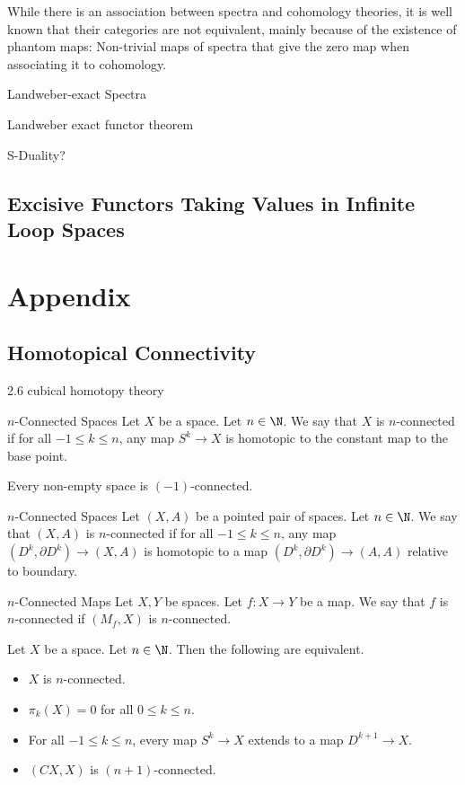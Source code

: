 \documentclass[a4paper]{article}
\begin{document}
While there is an association between spectra and cohomology theories, it is well known that their categories are not equivalent, mainly because of the existence of phantom maps: Non-trivial maps of spectra that give the zero map when associating it to cohomology. 

\begin{eg}{Landweber-exact Spectra}{}
\end{eg}

\begin{thm}{Landweber exact functor theorem}{}
\end{thm}

S-Duality?

\subsection{Excisive Functors Taking Values in Infinite Loop Spaces}



\pagebreak
\section{Appendix}
\subsection{Homotopical Connectivity}
2.6 cubical homotopy theory
\begin{defn}{$n$-Connected Spaces}{} Let $X$ be a space. Let $n\in\N$. We say that $X$ is $n$-connected if for all $-1\leq k\leq n$, any map $S^k\to X$ is homotopic to the constant map to the base point. 
\end{defn}

Every non-empty space is $(-1)$-connected. 

\begin{defn}{$n$-Connected Spaces}{} Let $(X,A)$ be a pointed pair of spaces. Let $n\in\N$. We say that $(X,A)$ is $n$-connected if for all $-1\leq k\leq n$, any map $(D^k,\partial D^k)\to(X,A)$ is homotopic to a map $(D^k,\partial D^k)\to (A,A)$ relative to boundary. 
\end{defn}

\begin{defn}{$n$-Connected Maps}{} Let $X,Y$ be spaces. Let $f:X\to Y$ be a map. We say that $f$ is $n$-connected if $(M_f,X)$ is $n$-connected. 
\end{defn}

\begin{prp}{}{} Let $X$ be a space. Let $n\in\N$. Then the following are equivalent. 
\begin{itemize}
\item $X$ is $n$-connected. 
\item $\pi_k(X)=0$ for all $0\leq k\leq n$. 
\item For all $-1\leq k\leq n$, every map $S^k\to X$ extends to a map $D^{k+1}\to X$. 
\item $(CX,X)$ is $(n+1)$-connected. 
\end{itemize}
\end{prp}
\end{document}
